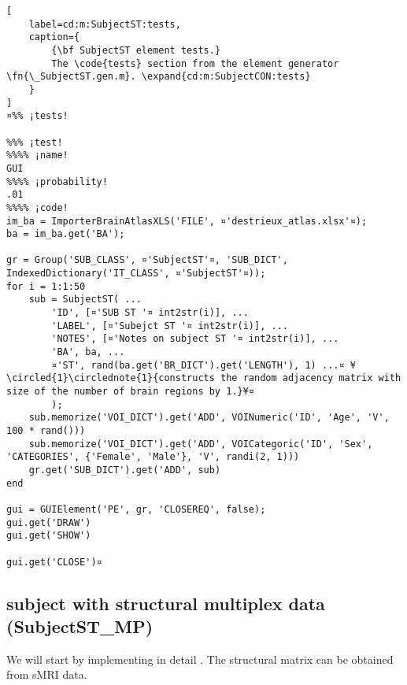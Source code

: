 \documentclass{tufte-handout}
\begin{document}
\begin{lstlisting}[
	label=cd:m:SubjectST:tests,
	caption={
		{\bf SubjectST element tests.}
		The \code{tests} section from the element generator \fn{\_SubjectST.gen.m}. \expand{cd:m:SubjectCON:tests}
	}
]
¤%% ¡tests!

%%% ¡test!
%%%% ¡name!
GUI
%%%% ¡probability!
.01
%%%% ¡code!
im_ba = ImporterBrainAtlasXLS('FILE', ¤'destrieux_atlas.xlsx'¤);
ba = im_ba.get('BA');

gr = Group('SUB_CLASS', ¤'SubjectST'¤, 'SUB_DICT', IndexedDictionary('IT_CLASS', ¤'SubjectST'¤));
for i = 1:1:50
    sub = SubjectST( ...
        'ID', [¤'SUB ST '¤ int2str(i)], ...
        'LABEL', [¤'Subejct ST '¤ int2str(i)], ...
        'NOTES', [¤'Notes on subject ST '¤ int2str(i)], ...
        'BA', ba, ...
        ¤'ST', rand(ba.get('BR_DICT').get('LENGTH'), 1) ...¤ ¥\circled{1}\circlednote{1}{constructs the random adjacency matrix with size of the number of brain regions by 1.}¥¤
        );
    sub.memorize('VOI_DICT').get('ADD', VOINumeric('ID', 'Age', 'V', 100 * rand()))
    sub.memorize('VOI_DICT').get('ADD', VOICategoric('ID', 'Sex', 'CATEGORIES', {'Female', 'Male'}, 'V', randi(2, 1)))
    gr.get('SUB_DICT').get('ADD', sub)
end

gui = GUIElement('PE', gr, 'CLOSEREQ', false);
gui.get('DRAW')
gui.get('SHOW')

gui.get('CLOSE')¤
\end{lstlisting}

\clearpage
\subsection{subject with structural multiplex data (SubjectST\_MP)}

We will start by implementing in detail . The structural matrix can be obtained from sMRI data.
\end{document}
